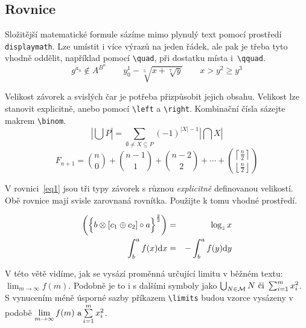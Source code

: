 \documentclass[a4paper, twocolumn, 11pt]{article}
\begin{document}
\subsection{Rovnice}
    \par Složitější matematické formule sázíme mimo plynulý text  pomocí prostředí \verb|displaymath|. Lze umístit i více výrazů na jeden řádek, ale pak je třeba tyto vhodně oddělit, například pomocí \verb|\quad|, při dostatku místa i~\verb|\qquad|.
\begin{displaymath}
g^{a_n} \notin A^{B^n} \qquad y^1_0 - \sqrt[5]{x + \sqrt[7]{y}} \qquad x > y^2 \geq y^3  
\end{displaymath}
\par Velikost závorek a svislých čar je potřeba přizpůsobit jejich obsahu. Velikost lze stanovit explicitně, anebo pomocí \verb|\left| a \verb|\right|. Kombinační čísla sá\-zejte makrem \verb|\binom|.
\begin{displaymath}
    \left| \bigcup P \right| = \sum\limits_{\emptyset \neq X \subseteq P} (-1)^{|X|-1} \left| \bigcap X \right|
\end{displaymath}
\begin{displaymath}
    F_{n+1} = \binom{n}{0} + \binom{n-1}{1} + \binom{n-2}{2}+ \cdots + \binom{\left\lceil\frac{n}{2}\right\rceil}{\left\lfloor\frac{n}{2}\right\rfloor}
\end{displaymath}


\par V rovnici~\eqref{eq1} jsou tři typy závorek s různou \emph{explicitně} definovanou velikostí. Obě rovnice mají svisle zarovnaná rovnítka. Použijte k tomu vhodné prostředí.

\begin{eqnarray}
    \biggl( \Bigl\{ b \otimes [c_1 \oplus c_2] \circ a \Bigr\}^{\frac{2}{3}} \biggr) & = & \log_zx \label{eq1} \\
    \int_b^a f(x) \mathrm{d}x & = & -\int_b^a f(y)\mathrm{d}y \label{eq2}
\end{eqnarray}


\par \noindent V této větě vidíme, jak se vysází proměnná určující
limitu v běžném textu: $\lim_{m\to\infty}f(m)$. Podobně je to i s dalšími symboly jako 
$\bigcup_{N\in \mathcal{M}}N \textnormal{ či } \sum^m_{ i=1 }x^2_i$. S vynucením méně úsporné sazby příkazem \verb|\limits| budou
vzorce vysázeny v podobě $\lim\limits_{m\to\infty}f(m) \textnormal{ a} \sum\limits^m_{i=1}x^2_i$.
\end{document}
